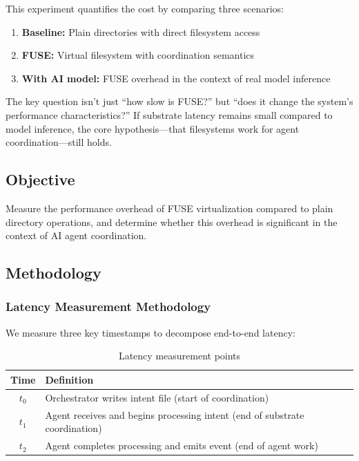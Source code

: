 \documentclass[11pt]{article}
\begin{document}
This experiment quantifies the cost by comparing three scenarios:
\begin{enumerate}
\item \textbf{Baseline:} Plain directories with direct filesystem access
\item \textbf{FUSE:} Virtual filesystem with coordination semantics
\item \textbf{With AI model:} FUSE overhead in the context of real model inference
\end{enumerate}

The key question isn't just ``how slow is FUSE?'' but ``does it change the system's performance characteristics?'' If substrate latency remains small compared to model inference, the core hypothesis---that filesystems work for agent coordination---still holds.

\subsection{Objective}

Measure the performance overhead of FUSE virtualization compared to plain directory operations, and determine whether this overhead is significant in the context of AI agent coordination.

\subsection{Methodology}

\subsubsection{Latency Measurement Methodology}

We measure three key timestamps to decompose end-to-end latency:

\begin{table}[h]
\centering
\begin{tabular}{cp{11cm}}
\toprule
\textbf{Time} & \textbf{Definition} \\
\midrule
$t_0$ & Orchestrator writes intent file (start of coordination) \\
$t_1$ & Agent receives and begins processing intent (end of substrate coordination) \\
$t_2$ & Agent completes processing and emits event (end of agent work) \\
\bottomrule
\end{tabular}
\caption{Latency measurement points}
\end{table}
\end{document}
